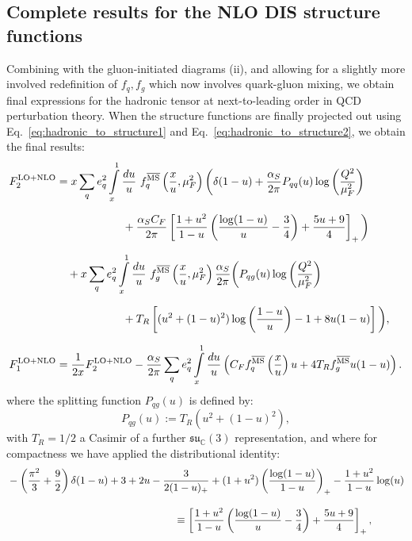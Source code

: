 \documentclass[withindex,glossary]{cam-thesis}
\begin{document}
\subsection{Complete results for the NLO DIS structure functions}
Combining with the gluon-initiated diagrams (ii), and allowing for a slightly more involved redefinition of $f_q, f_g$ which now involves quark-gluon mixing, we obtain final expressions for the hadronic tensor at next-to-leading order in QCD perturbation theory. When the structure functions are finally projected out using Eq.~\eqref{eq:hadronic_to_structure1} and Eq.~\eqref{eq:hadronic_to_structure2}, we obtain the final results:
\begin{align}
F_2^{\text{LO+NLO}} &= x \sum_{q} e_q^2 \int\limits_{x}^{1} \frac{du}{u}\ f^{\overline{\text{MS}}}_q\left(\frac{x}{u},\mu_F^2\right)   \bigg( \delta(1-u) + \frac{\alpha_S}{2\pi} P_{qq}(u) \log\left( \frac{Q^2}{\mu_F^2} \right) \notag\\[1.5ex]
&\qquad\qquad\qquad + \frac{\alpha_S C_F}{2\pi} \left[ \frac{1+u^2}{1-u} \left( \frac{\log(1-u)}{u} - \frac{3}{4} \right) + \frac{5u + 9}{4}\right]_+\bigg) \notag \\[1.5ex]
&\quad + x \sum_{q} e_q^2 \int\limits_{x}^{1} \frac{du}{u}\ f^{\overline{\text{MS}}}_g\left( \frac{x}{u}, \mu_F^2\right) \frac{\alpha_S}{2\pi} \bigg( P_{qg}(u) \log\left( \frac{Q^2}{\mu_F^2}\right) \notag \\[1.5ex]
&\qquad\qquad\qquad + T_R \left[ (u^2 + (1-u)^2) \log\left( \frac{1-u}{u} \right) - 1 + 8u(1-u)\right] \bigg),\\[1.5ex]
F_1^{\text{LO+NLO}} &= \frac{1}{2x} F_2^{\text{LO+NLO}} - \frac{\alpha_S}{2\pi} \sum_{q} e_q^2 \int\limits_{x}^{1} \frac{du}{u} \left( C_F f_q^{\overline{\text{MS}}}\left( \frac{x}{u} \right) u + 4T_R f_g^{\overline{\text{MS}}} u(1-u) \right).
\end{align}
where the splitting function $P_{qg}(u)$ is defined by:
\begin{equation}
P_{qg}(u) := T_R ( u^2 + (1-u)^2 ),
\end{equation}
with $T_R=1/2$ a Casimir of a further $\mathfrak{su}_\mathbb{C}(3)$ representation, and where for compactness we have applied the distributional identity:
\begin{align}
&-\left( \frac{\pi^2}{3} + \frac{9}{2} \right) \delta(1-u) + 3 + 2u - \frac{3}{2(1-u)_+} + (1+u^2) \left( \frac{\log(1-u)}{1-u} \right)_+ - \frac{1+u^2}{1-u} \log(u)\notag \\[2ex]
&\qquad\qquad\qquad\qquad\qquad\qquad\qquad\qquad \equiv \left[ \frac{1+u^2}{1-u} \left( \frac{\log(1-u)}{u} - \frac{3}{4} \right) + \frac{5u + 9}{4}\right]_+,
\end{align}
\end{document}

